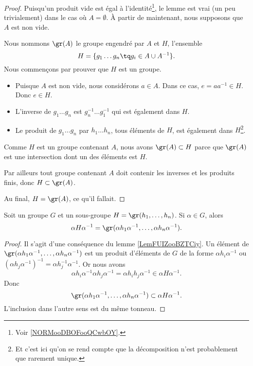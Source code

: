 \begin{proof}
	Puisqu'un produit vide est égal à l'identité\footnote{Voir \ref{NORMooDBOFooQCwbOY}.}, le lemme est vrai (un peu trivialement) dans le cas où \( A=\emptyset\). À partir de maintenant, nous supposons que \( A\) est non vide.

	Nous nommons \( \gr(A)\) le groupe engendré par \( A\) et \( H\), l'ensemble
	\begin{equation}
		H=\{ g_1\ldots g_n\tq g_i\in A\cup A^{-1} \}.
	\end{equation}
	Nous commençons par prouver que \( H\) est un groupe.
	\begin{itemize}
		\item Puisque \( A\) est non vide, nous considérons \( a\in A\). Dans ce cas, \( e=aa^{-1}\in H\). Donc \( e\in H\).
		\item L'inverse de \( g_1\ldots g_n\) est \( g_n^{-1}\ldots g_1^{-1}\) qui est également dans \( H\).
		\item Le produit de \( g_1\ldots g_n\) par \( h_1\ldots h_n\), tous éléments de \( H\), est également dans \( H\)\footnote{Et c'est ici qu'on se rend compte que la décomposition n'est probablement que rarement unique.}.
	\end{itemize}
	Comme \( H\) est un groupe contenant \( A\), nous avons \( \gr(A)\subset H\) parce que \( \gr(A)\) est une intersection dont un des éléments est \( H\).

	Par ailleurs tout groupe contenant \( A\) doit contenir les inverses et les produits finis, donc \( H\subset \gr(A)\).

	Au final, \( H=\gr(A)\), ce qu'il fallait.
\end{proof}

\begin{lemma}       \label{LEMooCFTVooKvmyKN}
	Soit un groupe \( G\) et un sous-groupe \( H=\gr(h_1,\ldots, h_n)\). Si \( \alpha\in G\), alors
	\begin{equation}
		\alpha H\alpha^{-1}=\gr(\alpha h_1\alpha^{-1},\ldots, \alpha h_n\alpha^{-1}).
	\end{equation}
\end{lemma}

\begin{proof}
	Il s'agit d'une conséquence du lemme \ref{LemFUIZooBZTCiy}. Un élément de \( \gr(\alpha h_1\alpha^{-1},\ldots, \alpha h_n\alpha^{-1})\) est un produit d'éléments de \( G\) de la forme \( \alpha h_i\alpha^{-1}\) ou \( (\alpha h_j\alpha^{-1})^{-1}=\alpha h_j^{-1}\alpha^{-1}\). Or nous avons
	\begin{equation}
		\alpha h_i\alpha^{-1}\alpha h_j\alpha^{-1}=\alpha h_ih_j\alpha^{-1}\in \alpha H\alpha^{-1}.
	\end{equation}
	Donc
	\begin{equation}
		\gr(\alpha h_1\alpha^{-1},\ldots, \alpha h_n\alpha^{-1})\subset \alpha H\alpha^{-1}.
	\end{equation}
	L'inclusion dans l'autre sens est du même tonneau.
\end{proof}

